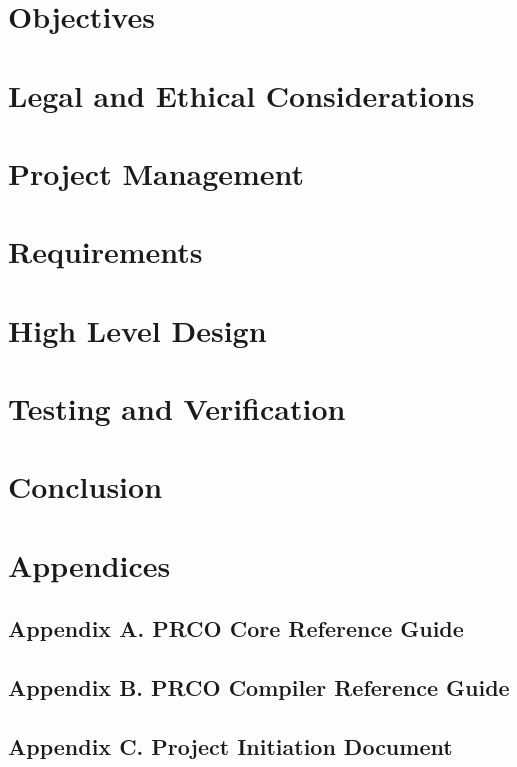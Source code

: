 \documentclass[11pt,a4paper]{article}
\begin{document}
\section{Objectives}

\section{Legal and Ethical Considerations}

\section{Project Management}

\section{Requirements}

\section{High Level Design}

\section{Testing and Verification}

\section{Conclusion}

\section{Appendices}
\subsection{Appendix A. PRCO Core Reference Guide}
\subsection{Appendix B. PRCO Compiler Reference Guide}
\subsection{Appendix C. Project Initiation Document}

\newpage
 
\end{document}
